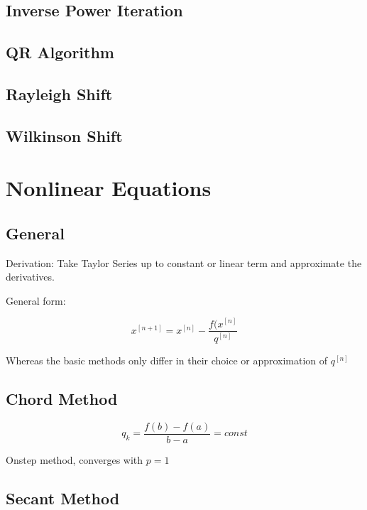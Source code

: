 \documentclass[
    a4paper,
    11pt
]{article}
\begin{document}
\subsection{Inverse Power Iteration}

\subsection{QR Algorithm}

\subsection{Rayleigh Shift}

\subsection{Wilkinson Shift}

\section{Nonlinear Equations}

\subsection{General}
Derivation: Take Taylor Series up to constant or linear term and approximate the
derivatives.

General form:

\begin{equation}
    x^{[n+1]} = x^{[n]} - \frac{f(x^{[n]}}{q^{[n]}}
\end{equation}

Whereas the basic methods only differ in their choice or approximation of
$q^{[n]}$

\subsection{Chord Method}

\begin{equation}
    q_k = \frac{f(b) - f(a)}{b - a} = const
\end{equation}

Onstep method, converges with $p=1$

\subsection{Secant Method}
\end{document}

